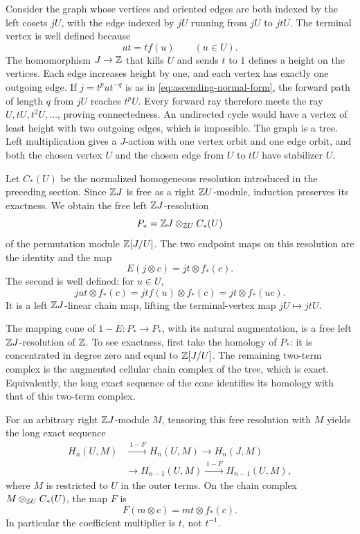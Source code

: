 Consider the graph whose vertices and oriented edges are both
indexed by the left cosets $jU$, with the edge indexed by $jU$
running from $jU$ to $jtU$.  The terminal vertex is well defined
because
\begin{equation}\label{eq:ascending-commutation}
 ut=tf(u)\qquad(u\in U).
\end{equation}
The homomorphism $J\to\mathbb Z$ that kills $U$ and sends $t$ to $1$
defines a height on the vertices.  Each edge increases height by
one, and each vertex has exactly one outgoing edge.
If $j=t^p u t^{-q}$ is as in
\eqref{eq:ascending-normal-form}, the forward path of length $q$
from $jU$ reaches $t^pU$.  Every forward ray therefore meets the
ray $U,tU,t^2U,\ldots$, proving connectedness.  An undirected
cycle would have a vertex of least height with two outgoing edges,
which is impossible.  The graph is a tree.  Left multiplication
gives a $J$-action with one vertex orbit and one edge orbit, and
both the chosen vertex $U$ and the chosen edge from $U$ to $tU$
have stabilizer $U$.

Let $C_*(U)$ be the normalized homogeneous resolution introduced
in the preceding section.  Since $\mathbb Z J$ is free as a right
$\mathbb Z U$-module, induction preserves its exactness.  We obtain the free left
$\mathbb Z J$-resolution
\[
 P_* =\mathbb Z J\otimes_{\mathbb Z U}C_*(U)
\]
of the permutation module $\mathbb Z[J/U]$.  The two endpoint maps on
this resolution are the identity and the map
\[
 E(j\otimes c)=jt\otimes f_*(c).
\]
The second is well defined: for $u\in U$,
\[
 jut\otimes f_*(c)
   =jt f(u)\otimes f_*(c)
   =jt\otimes f_*(uc).
\]
It is a left $\mathbb Z J$-linear chain map, lifting the terminal-vertex
map $jU\mapsto jtU$.

The mapping cone of $1-E:P_*\to P_*$, with its natural
augmentation, is a free left $\mathbb Z J$-resolution of $\mathbb Z$.
To see exactness, first take the homology of $P_*$: it is
concentrated in degree zero and equal to $\mathbb Z[J/U]$.  The
remaining two-term complex is the augmented cellular chain
complex of the tree, which is exact.  Equivalently, the long exact
sequence of the cone identifies its homology with that of this
two-term complex.

For an arbitrary right $\mathbb Z J$-module $M$, tensoring this free
resolution with $M$ yields the long exact sequence
\begin{equation}\label{eq:ascending-hnn-homology}
 \begin{split}
 H_n(U,M)&\xrightarrow{\,1-F\,}H_n(U,M)
      \longrightarrow H_n(J,M)\\
      &\longrightarrow H_{n-1}(U,M)
          \xrightarrow{\,1-F\,}H_{n-1}(U,M),
 \end{split}
\end{equation}
where $M$ is restricted to $U$ in the outer terms.  On the chain
complex $M\otimes_{\mathbb Z U}C_*(U)$, the map $F$ is
\begin{equation}\label{eq:coefficient-shift}
 F(m\otimes c)=mt\otimes f_*(c).
\end{equation}
In particular the coefficient multiplier is $t$, not $t^{-1}$.

